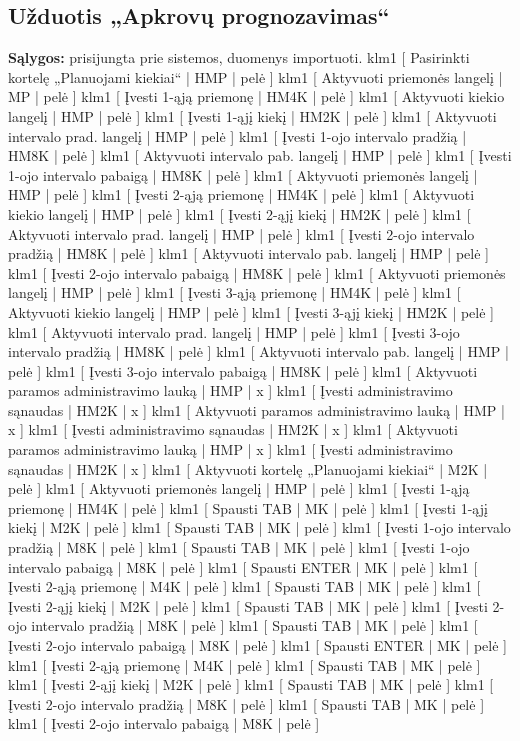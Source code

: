 \subsection{Užduotis „Apkrovų prognozavimas“}
\textbf{Sąlygos:} prisijungta prie sistemos, duomenys importuoti.
\klm
{
  klm1 [ Pasirinkti kortelę „Planuojami kiekiai“ | HMP | pelė ]  
  klm1 [ Aktyvuoti priemonės langelį | MP | pelė ]  
  klm1 [ Įvesti 1-ąją priemonę | HM4K | pelė ]
  klm1 [ Aktyvuoti kiekio langelį | HMP | pelė ] 
  klm1 [ Įvesti 1-ąjį kiekį | HM2K | pelė ] 
  klm1 [ Aktyvuoti intervalo prad. langelį | HMP | pelė ] 
  klm1 [ Įvesti 1-ojo intervalo pradžią | HM8K | pelė ] 
  klm1 [ Aktyvuoti intervalo pab. langelį | HMP | pelė ] 
  klm1 [ Įvesti 1-ojo intervalo pabaigą | HM8K | pelė ] 
  klm1 [ Aktyvuoti priemonės langelį | HMP | pelė ]  
  klm1 [ Įvesti 2-ąją priemonę | HM4K | pelė ]
  klm1 [ Aktyvuoti kiekio langelį | HMP | pelė ] 
  klm1 [ Įvesti 2-ąjį kiekį | HM2K | pelė ] 
  klm1 [ Aktyvuoti intervalo prad. langelį | HMP | pelė ] 
  klm1 [ Įvesti 2-ojo intervalo pradžią | HM8K | pelė ] 
  klm1 [ Aktyvuoti intervalo pab. langelį | HMP | pelė ] 
  klm1 [ Įvesti 2-ojo intervalo pabaigą | HM8K | pelė ] 
  klm1 [ Aktyvuoti priemonės langelį | HMP | pelė ]  
  klm1 [ Įvesti 3-ąją priemonę | HM4K | pelė ]
  klm1 [ Aktyvuoti kiekio langelį | HMP | pelė ] 
  klm1 [ Įvesti 3-ąjį kiekį | HM2K | pelė ] 
  klm1 [ Aktyvuoti intervalo prad. langelį | HMP | pelė ] 
  klm1 [ Įvesti 3-ojo intervalo pradžią | HM8K | pelė ] 
  klm1 [ Aktyvuoti intervalo pab. langelį | HMP | pelė ] 
  klm1 [ Įvesti 3-ojo intervalo pabaigą | HM8K | pelė ] 
  klm1 [ Aktyvuoti paramos administravimo lauką | HMP | x ]
  klm1 [ Įvesti administravimo sąnaudas | HM2K | x ]
  klm1 [ Aktyvuoti paramos administravimo lauką | HMP | x ]
  klm1 [ Įvesti administravimo sąnaudas | HM2K | x ]
  klm1 [ Aktyvuoti paramos administravimo lauką | HMP | x ]
  klm1 [ Įvesti administravimo sąnaudas | HM2K | x ]
}
{
  klm1 [ Aktyvuoti kortelę „Planuojami kiekiai“ | M2K | pelė ]  
  klm1 [ Aktyvuoti priemonės langelį | HMP | pelė ]  
  klm1 [ Įvesti 1-ąją priemonę | HM4K | pelė ]
  klm1 [ Spausti TAB | MK | pelė ] 
  klm1 [ Įvesti 1-ąjį kiekį | M2K | pelė ] 
  klm1 [ Spausti TAB | MK | pelė ] 
  klm1 [ Įvesti 1-ojo intervalo pradžią | M8K | pelė ] 
  klm1 [ Spausti TAB | MK | pelė ] 
  klm1 [ Įvesti 1-ojo intervalo pabaigą | M8K | pelė ] 
  klm1 [ Spausti ENTER | MK | pelė ]  
  klm1 [ Įvesti 2-ąją priemonę | M4K | pelė ]
  klm1 [ Spausti TAB | MK | pelė ] 
  klm1 [ Įvesti 2-ąjį kiekį | M2K | pelė ] 
  klm1 [ Spausti TAB | MK | pelė ] 
  klm1 [ Įvesti 2-ojo intervalo pradžią | M8K | pelė ] 
  klm1 [ Spausti TAB | MK | pelė ] 
  klm1 [ Įvesti 2-ojo intervalo pabaigą | M8K | pelė ] 
  klm1 [ Spausti ENTER | MK | pelė ]  
  klm1 [ Įvesti 2-ąją priemonę | M4K | pelė ]
  klm1 [ Spausti TAB | MK | pelė ] 
  klm1 [ Įvesti 2-ąjį kiekį | M2K | pelė ] 
  klm1 [ Spausti TAB | MK | pelė ] 
  klm1 [ Įvesti 2-ojo intervalo pradžią | M8K | pelė ] 
  klm1 [ Spausti TAB | MK | pelė ] 
  klm1 [ Įvesti 2-ojo intervalo pabaigą | M8K | pelė ] 
}


